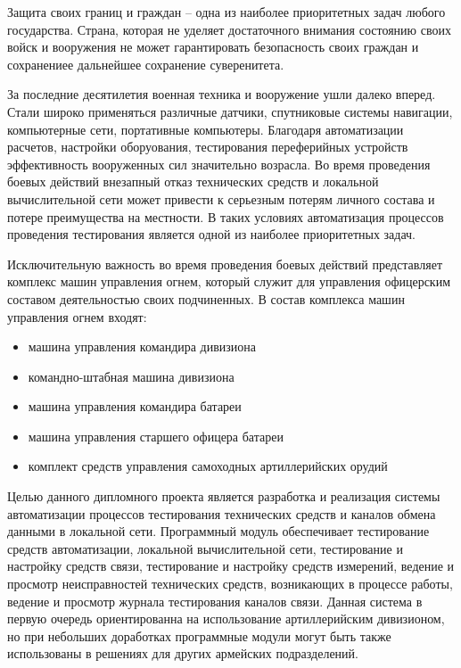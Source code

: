 \label{sec:intro}

Защита своих границ и граждан -- одна из наиболее приоритетных задач любого государства.
Страна, которая не уделяет достаточного внимания состоянию своих войск и вооружения не может гарантировать безопасность своих граждан и сохранениее дальнейшее сохранение суверенитета.

За последние десятилетия военная техника и вооружение ушли далеко вперед.
Стали широко применяться различные датчики, спутниковые системы навигации, компьютерные сети, портативные компьютеры.
Благодаря автоматизации расчетов, настройки оборуования, тестирования переферийных устройств эффективность вооруженных сил значительно возрасла.
Во время проведения боевых действий внезапный отказ технических средств и локальной вычислительной сети может привести к серьезным потерям личного состава и потере преимущества на местности.
В таких условиях автоматизация процессов проведения тестирования является одной из наиболее приоритетных задач.

Исключительную важность во время проведения боевых действий представляет комплекс машин управления огнем, который служит для управления офицерским составом деятельностью своих подчиненных.
В состав комплекса машин управления огнем входят:
\begin{itemize}
    \item машина управления командира дивизиона
    \item командно-штабная машина дивизиона
    \item машина управления командира батареи
    \item машина управления старшего офицера батареи
    \item комплект средств управления самоходных артиллерийских орудий
\end{itemize}

Целью данного дипломного проекта является разработка и реализация системы автоматизации процессов тестирования технических средств и каналов обмена данными в локальной сети.
Программный модуль обеспечивает тестирование средств автоматизации, локальной вычислительной сети, тестирование и настройку средств связи, тестирование и настройку средств измерений, ведение и просмотр неисправностей технических средств, возникающих в процессе работы, ведение и просмотр журнала тестирования каналов связи.
Данная система в первую очередь ориентированна на использование артиллерийским дивизионом, но при небольших доработках программные модули могут быть также использованы в решениях для других армейских подразделений.

